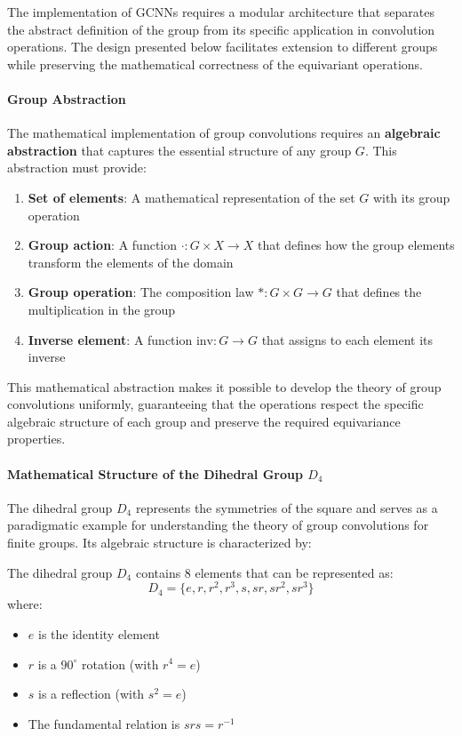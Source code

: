 The implementation of \glspl{GCNN} requires a modular architecture that separates the abstract definition of the group from its specific application in convolution operations. The design presented below facilitates extension to different groups while preserving the mathematical correctness of the equivariant operations.

\paragraph{Group Abstraction}

The mathematical implementation of group convolutions requires an \textbf{algebraic abstraction} that captures the essential structure of any group $G$. This abstraction must provide:

\begin{enumerate}
    \item \textbf{Set of elements}: A mathematical representation of the set $G$ with its group operation
    \item \textbf{Group action}: A function $\cdot: G \times X \to X$ that defines how the group elements transform the elements of the domain
    \item \textbf{Group operation}: The composition law $*: G \times G \to G$ that defines the multiplication in the group
    \item \textbf{Inverse element}: A function $\text{inv}: G \to G$ that assigns to each element its inverse
\end{enumerate}

This mathematical abstraction makes it possible to develop the theory of group convolutions uniformly, guaranteeing that the operations respect the specific algebraic structure of each group and preserve the required equivariance properties.

\paragraph{Mathematical Structure of the Dihedral Group $D_4$}

The dihedral group $D_4$ represents the symmetries of the square and serves as a paradigmatic example for understanding the theory of group convolutions for finite groups. Its algebraic structure is characterized by:

\begin{definition}[Elements of $D_4$]
The dihedral group $D_4$ contains 8 elements that can be represented as:
\begin{equation}
D_4 = \{e, r, r^2, r^3, s, sr, sr^2, sr^3\}
\end{equation}
where:
\begin{itemize}
    \item $e$ is the identity element
    \item $r$ is a $90^\circ$ rotation (with $r^4 = e$)
    \item $s$ is a reflection (with $s^2 = e$)
    \item The fundamental relation is $srs = r^{-1}$
\end{itemize}
\end{definition}


